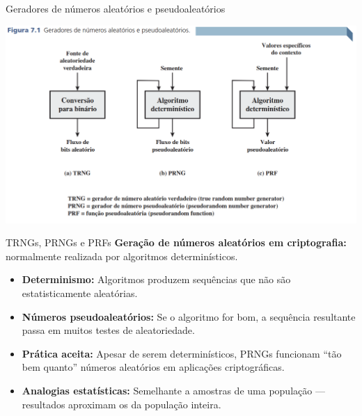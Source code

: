 \begin{frame}{Geradores de números aleatórios e pseudoaleatórios}

\centering
\includegraphics[width=0.9\linewidth]{Figuras/TRNgsPRNGsPRFs.png}


\end{frame}

\begin{frame}{TRNGs, PRNGs e PRFs}
\textbf{Geração de números aleatórios em criptografia:} normalmente realizada por algoritmos determinísticos.

\medskip
\begin{itemize}
    \item \textbf{Determinismo:} Algoritmos produzem sequências que não são estatisticamente aleatórias.
    \item \textbf{Números pseudoaleatórios:} Se o algoritmo for bom, a sequência resultante passa em muitos testes de aleatoriedade.
    \item \textbf{Prática aceita:} Apesar de serem determinísticos, PRNGs funcionam “tão bem quanto” números aleatórios em aplicações criptográficas.
    \item \textbf{Analogias estatísticas:} Semelhante a amostras de uma população — resultados aproximam os da população inteira.
\end{itemize}

\end{frame}

